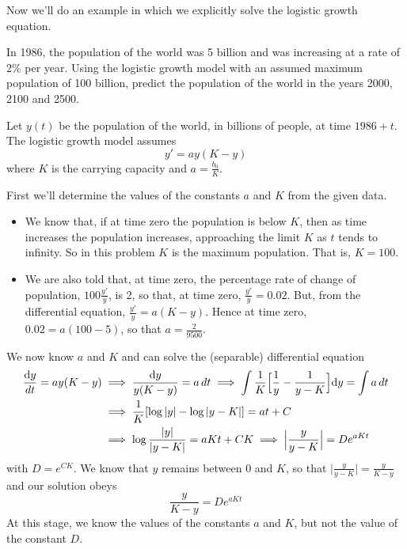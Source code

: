 \noindent Now we'll do an example in which we explicitly solve the logistic
growth equation.

\begin{eg}\label{eg:SDElogisticA}
 In 1986, the population of the world was 5 billion and was
increasing at a rate of 2\% per year. Using the logistic growth model
with an assumed maximum population of 100 billion, predict the population
of the world in the years 2000, 2100 and 2500.


\soln Let $y(t)$ be the population of the world, in billions of people,
at time $1986+t$. The logistic growth model assumes
\begin{equation*}
y'=ay(K-y)
\end{equation*}
where $K$ is the carrying capacity and $a=\frac{b_0}{K}$.

First we'll determine the values of the constants $a$ and $K$ from the
given data.
\begin{itemize}\itemsep1pt \parskip0pt  %
\item
We know  that, if at time zero the population is below $K$, then as time
increases the population increases, approaching the limit $K$ as $t$ tends
to infinity. So in this problem $K$ is the maximum population. That is,
$K=100$.
\item
 We are also told that, at time zero, the percentage rate of change
of population, $100\frac{y'}{y}$, is 2, so that, at time zero,
$\frac{y'}{y}=0.02$.
But, from the differential equation, $\frac{y'}{y}=a(K-y)$. Hence at time
zero, $0.02=a(100-5)$, so that $a= \frac{2}{9500}$.
\end{itemize}
We now know $a$ and $K$ and can solve the (separable) differential equation
\begin{align*}
\frac{\mathrm{d}y}{dt}=ay(K-y)&\implies
\frac{\mathrm{d}y}{y(K-y)}=a\,dt\implies
\int\frac{1}{K}\Big[\frac{1}{y}-\frac{1}{y-K}\Big]\mathrm{d}y=\int a\,dt\\
&\implies \frac{1}{K}[\log |y|-\log|y-K|]=at+C \\
&\implies  \log\frac{|y|}{|y-K|}=aKt+CK\implies
\Big|\frac{y}{y-K}\Big|=De^{aKt}
\end{align*}
with $D=e^{CK}$. We know that $y$ remains between $0$ and $K$, so that
$\Big|\frac{y}{y-K}\Big|=\frac{y}{K-y}$ and our solution obeys
\begin{equation*}
\frac{y}{K-y}=De^{aKt}
\end{equation*}
At this stage, we know the values of the constants $a$ and $K$, but not
the value of the constant $D$.

\end{eg}
